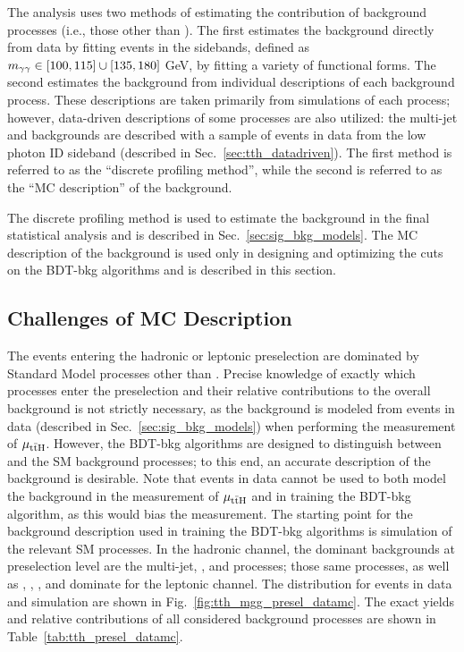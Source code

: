 The analysis uses two methods of estimating the contribution of background processes (i.e., those other than \ttH).
The first estimates the background directly from data by fitting events in the \mgg sidebands, defined as $m_{\gamma\gamma} \in [100, 115] \cup [135, 180]$ GeV, by fitting a variety of functional forms.
The second estimates the background from individual descriptions of each background process.
These descriptions are taken primarily from simulations of each process; however, data-driven descriptions of some processes are also utilized: the multi-jet and \gjets backgrounds are described with a sample of events in data from the low photon ID sideband (described in Sec.~\ref{sec:tth_datadriven}).
The first method is referred to as the ``discrete profiling method'', while the second is referred to as the ``MC description'' of the background.

The discrete profiling method is used to estimate the background in the final statistical analysis and is described in Sec.~\ref{sec:sig_bkg_models}.
The MC description of the background is used only in designing and optimizing the cuts on the BDT-bkg algorithms and is described in this section.

\subsection{Challenges of MC Description} \label{sec:tth_mc_description}
The events entering the hadronic or leptonic preselection are dominated by Standard Model processes other than \ttH.
Precise knowledge of exactly which processes enter the preselection and their relative contributions to the overall background is not strictly necessary, as the background is modeled from events in data (described in Sec.~\ref{sec:sig_bkg_models}) when performing the measurement of $\mu_{\mathrm{t\bar{t}H}}$.
However, the BDT-bkg algorithms are designed to distinguish between \ttH and the SM background processes; to this end, an accurate description of the background is desirable.
Note that events in data cannot be used to both model the background in the measurement of $\mu_{\mathrm{t\bar{t}H}}$ and in training the BDT-bkg algorithm, as this would bias the measurement.
The starting point for the background description used in training the BDT-bkg algorithms is simulation of the relevant SM processes.
In the hadronic channel, the dominant backgrounds at preselection level are the multi-jet, \gjets, and \dipho processes; those same processes, as well as \ttbar, \ttg, \ttgg, and \Vgamma dominate for the leptonic channel.
The \mgg distribution for events in data and simulation are shown in Fig.~\ref{fig:tth_mgg_presel_datamc}.
The exact yields and relative contributions of all considered background processes are shown in Table~\ref{tab:tth_presel_datamc}.

